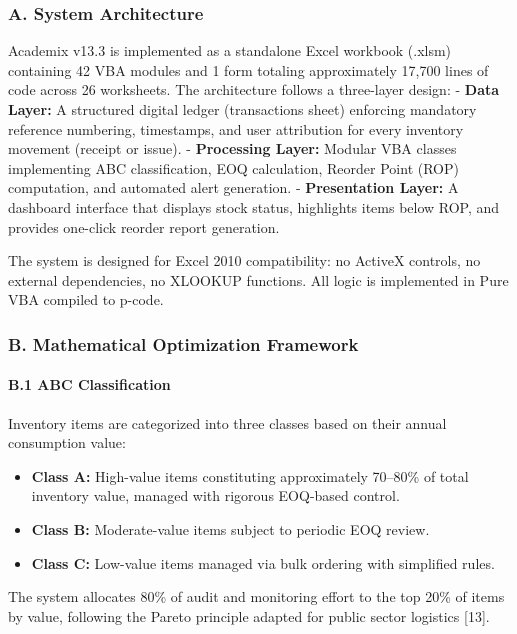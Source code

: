 ﻿\documentclass[conference]{IEEEtran}
\begin{document}
\subsubsection{A. System Architecture}\label{a.-system-architecture}

Academix v13.3 is implemented as a standalone Excel workbook (.xlsm)
containing 42 VBA modules and 1 form totaling approximately 17,700 lines
of code across 26 worksheets. The architecture follows a three-layer
design: - \textbf{Data Layer:} A structured digital ledger (transactions
sheet) enforcing mandatory reference numbering, timestamps, and user
attribution for every inventory movement (receipt or issue). -
\textbf{Processing Layer:} Modular VBA classes implementing ABC
classification, EOQ calculation, Reorder Point (ROP) computation, and
automated alert generation. - \textbf{Presentation Layer:} A dashboard
interface that displays stock status, highlights items below ROP, and
provides one-click reorder report generation.

The system is designed for Excel 2010 compatibility: no ActiveX
controls, no external dependencies, no XLOOKUP functions. All logic is
implemented in Pure VBA compiled to p-code.

\subsubsection{B. Mathematical Optimization
Framework}\label{b.-mathematical-optimization-framework}

\paragraph{B.1 ABC Classification}\label{b.1-abc-classification}

Inventory items are categorized into three classes based on their annual
consumption value:

\begin{itemize}
\tightlist
\item
  \textbf{Class A:} High-value items constituting approximately 70--80\%
  of total inventory value, managed with rigorous EOQ-based control.
\item
  \textbf{Class B:} Moderate-value items subject to periodic EOQ review.
\item
  \textbf{Class C:} Low-value items managed via bulk ordering with
  simplified rules.
\end{itemize}

The system allocates 80\% of audit and monitoring effort to the top 20\%
of items by value, following the Pareto principle adapted for public
sector logistics {[}13{]}.
\end{document}

